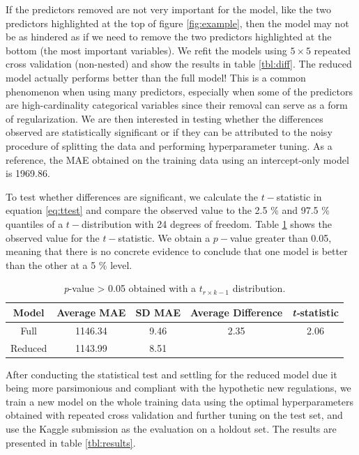 \documentclass[11pt,a4paper]{article}
\theoremstyle{plain}
\theoremstyle{definition}
\begin{document}
If the predictors removed are not very important for the model, like the two predictors highlighted at the top of figure \ref{fig:example}, then the model may not be as hindered as if we need to remove the two predictors highlighted at the bottom (the most important variables). We refit the models using $5\times 5$ repeated cross validation (non-nested) and show the results in table \ref{tbl:diff}. The reduced model actually performs better than the full model! This is a common phenomenon when using many predictors, especially when some of the predictors are high-cardinality categorical variables since their removal can serve as a form of regularization. We are then interested in testing whether the differences observed are statistically significant or if they can be attributed to the noisy procedure of splitting the data and performing hyperparameter tuning. As a reference, the MAE obtained on the training data using an intercept-only model is 1969.86.

To test whether differences are significant, we calculate the $t-$statistic in equation \ref{eq:ttest} and compare the observed value to the 2.5 \% and 97.5 \% quantiles of a $t-$distribution with 24 degrees of freedom. Table \ref{tbl:ttest} shows the observed value for the $t-$statistic. We obtain a $p-$value greater than 0.05, meaning that there is no concrete evidence to conclude that one model is better than the other at a 5 \% level.

\begin{table}[ht]
\centering
\begin{tabular}{|c|c|c|c|c|}
\hline
Model & Average MAE & SD MAE & Average Difference & \textit{t-}statistic\\
\hline
Full & 1146.34 & 9.46 & 2.35 & 2.06\\
Reduced & 1143.99 & 8.51 & &\\
\hline
\end{tabular}
\caption{\textit{p}-value > 0.05 obtained with a $t_{r\times k-1}$ distribution.}
\label{tbl:ttest}
\end{table}

After conducting the statistical test and settling for the reduced model due it being more parsimonious and compliant with the hypothetic new regulations, we train a new model on the whole training data using the optimal hyperparameters obtained with repeated cross validation and further tuning on the test set, and use the Kaggle submission as the evaluation on a holdout set. The results are presented in table \ref{tbl:results}.
\end{document}
